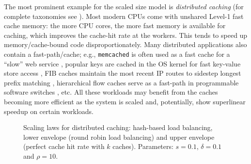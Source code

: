

The most prominent example for the scaled size model is \emph{distributed caching} \cite{scalability-analyzed, sdn-analytitcs, dobb-2} (for complete taxonomies see \cite{556383, 7733347, 80148}).  Most modern CPUs come with unshared Level-1 fast cache memory: the more CPU cores, the more fast memory is available for caching, which improves the cache-hit rate at the workers. This tends to speed up memory\slash cache-bound code disproportionately. Many distributed applications also contain a fast-path\slash cache; e.g., \texttt{memcached} is often used as a fast cache for a ``slow'' web service \cite{180324,10.5555/1012889.1012894}, popular keys are cached in the OS kernel for fast key-value store access \cite{179747, ghigoff2021bmc}, FIB caches maintain the most recent IP routes to sidestep longest prefix matching \cite{rottenstreich2016optimal}, hierarchical flow caches serve as a fast-path in programmable software switches \cite{188960}, etc. All these workloads may benefit from the caches becoming more efficient as the system is scaled and, potentially, show superlinear speedup on certain workloads. %

\begin{figure}
  \centering
  \begin{small}
    
\end{small}
\caption{Scaling laws for distributed caching: hash-based load balancing, lower envelope (round robin load balancing) and upper envelope (perfect cache hit rate with $k$ caches). Parameters: $s=0.1$, $\delta=0.1$ and $\rho=10$.}
  \label{fig:dcache-analysis}
\end{figure}

